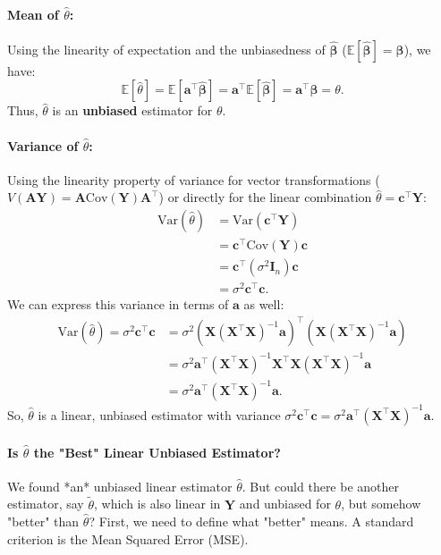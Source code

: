 \documentclass[11pt, letterpaper]{article}
\theoremstyle{plain} %
\theoremstyle{definition} %
\theoremstyle{remark} %
\renewcommand{\mathbf}{\boldsymbol} %
\newcommand{\E}{\mathbb{E}}
\newcommand{\V}{\mathrm{Var}} %
\newcommand{\Cov}{\mathrm{Cov}} %
\newcommand{\I}{\mathbf{I}} %
\begin{document}
\paragraph{Mean of $\hat{\theta}$:}
Using the linearity of expectation and the unbiasedness of $\hat{\boldsymbol{\beta}}$ ($\E[\hat{\boldsymbol{\beta}}] = \boldsymbol{\beta}$), we have:
\[
\E[\hat{\theta}] = \E[\boldsymbol{a}^{\top} \hat{\boldsymbol{\beta}}] = \boldsymbol{a}^{\top} \E[\hat{\boldsymbol{\beta}}] = \boldsymbol{a}^{\top} \boldsymbol{\beta} = \theta.
\]
Thus, $\hat{\theta}$ is an \textbf{unbiased} estimator for $\theta$.

\paragraph{Variance of $\hat{\theta}$:}
Using the linearity property of variance for vector transformations ($V(\boldsymbol{A}\boldsymbol{Y}) = \boldsymbol{A}\Cov(\boldsymbol{Y})\boldsymbol{A}^{\top}$) or directly for the linear combination $\hat{\theta} = \boldsymbol{c}^{\top}\boldsymbol{Y}$:
\begin{align*}
\V(\hat{\theta}) &= \V(\boldsymbol{c}^{\top} \boldsymbol{Y}) \\
&= \boldsymbol{c}^{\top} \Cov(\boldsymbol{Y}) \boldsymbol{c} \\
&= \boldsymbol{c}^{\top} (\sigma^2 \I_n) \boldsymbol{c} \\
&= \sigma^2 \boldsymbol{c}^{\top} \boldsymbol{c}.
\end{align*}
We can express this variance in terms of $\boldsymbol{a}$ as well:
\begin{align*}
\V(\hat{\theta}) = \sigma^2 \boldsymbol{c}^{\top} \boldsymbol{c} &= \sigma^2 \left( \boldsymbol{X} (\boldsymbol{X}^{\top}\boldsymbol{X})^{-1} \boldsymbol{a} \right)^{\top} \left( \boldsymbol{X} (\boldsymbol{X}^{\top}\boldsymbol{X})^{-1} \boldsymbol{a} \right) \\
&= \sigma^2 \boldsymbol{a}^{\top} (\boldsymbol{X}^{\top}\boldsymbol{X})^{-1} \boldsymbol{X}^{\top} \boldsymbol{X} (\boldsymbol{X}^{\top}\boldsymbol{X})^{-1} \boldsymbol{a} \\
&= \sigma^2 \boldsymbol{a}^{\top} (\boldsymbol{X}^{\top}\boldsymbol{X})^{-1} \boldsymbol{a}.
\end{align*}
So, $\hat{\theta}$ is a linear, unbiased estimator with variance $\sigma^2 \boldsymbol{c}^{\top}\boldsymbol{c} = \sigma^2 \boldsymbol{a}^{\top} (\boldsymbol{X}^{\top}\boldsymbol{X})^{-1} \boldsymbol{a}$.

\paragraph{Is $\hat{\theta}$ the "Best" Linear Unbiased Estimator?}
We found *an* unbiased linear estimator $\hat{\theta}$. But could there be another estimator, say $\tilde{\theta}$, which is also linear in $\boldsymbol{Y}$ and unbiased for $\theta$, but somehow "better" than $\hat{\theta}$? First, we need to define what "better" means. A standard criterion is the Mean Squared Error (MSE).
\end{document}
